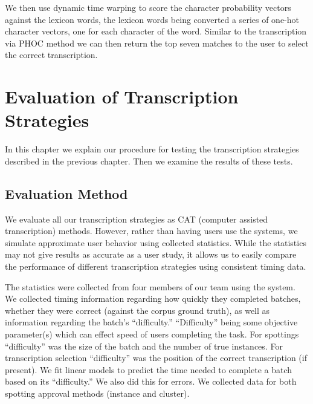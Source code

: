 \documentclass[ms,electronic,twosidetoc,letterpaper,chaptercenter,parttop,lof,lot]{byumsphd}
\begin{document}
We then use dynamic time warping to score the character probability vectors against the lexicon words, the lexicon words being converted a series of one-hot character vectors, one for each character of the word. Similar to the transcription via PHOC method we can then return the top seven matches to the user to select the correct transcription.




\chapter{Evaluation of Transcription Strategies}

In this chapter we explain our procedure for testing the transcription strategies described in the previous chapter. Then we examine the results of these tests.

\section{Evaluation Method}

We evaluate all our transcription strategies as CAT (computer assisted transcription) methods. However, rather than having users use the systems, we simulate approximate user behavior using collected statistics. While the statistics may not give results as accurate as a user study, it allows us to easily compare the performance of different transcription strategies using consistent timing data.

The statistics were collected from four members of our team
using the system. We collected timing information regarding how quickly they completed batches, whether they were correct (against the corpus ground truth),
 as well as information regarding the batch's ``difficulty.'' ``Difficulty'' being some objective parameter(s) which can effect  speed of users completing the task. For spottings ``difficulty'' was the size of the batch and the number of true instances. For transcription selection ``difficulty'' was the position of the correct transcription (if present). 
We fit linear models to predict the time needed to complete a batch based on its ``difficulty.'' We also did this for errors.
We collected data for both spotting approval methods (instance and cluster).
\end{document}
